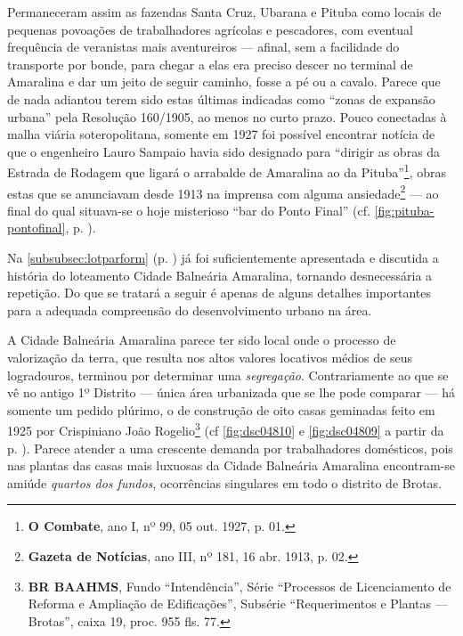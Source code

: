 Permaneceram assim as fazendas Santa Cruz, Ubarana e Pituba como locais de pequenas povoações de trabalhadores agrícolas e pescadores, com eventual frequência de veranistas mais aventureiros --- afinal, sem a facilidade do transporte por bonde, para chegar a elas era preciso descer no terminal de Amaralina e dar um jeito de seguir caminho, fosse a pé ou a cavalo. Parece que de nada adiantou terem sido estas últimas indicadas como ``zonas de expansão urbana'' pela Resolução 160/1905, ao menos no curto prazo. Pouco conectadas à malha viária soteropolitana, somente em 1927 foi possível encontrar notícia de que o engenheiro Lauro Sampaio havia sido designado para ``dirigir as obras da Estrada de Rodagem que ligará o arrabalde de Amaralina ao da Pituba''\footnote{\textbf{O Combate}, ano I, nº 99, 05 out. 1927, p. 01.}, obras estas que se anunciavam desde 1913 na imprensa com alguma ansiedade\footnote{\textbf{Gazeta de Notícias}, ano III, nº 181, 16 abr. 1913, p. 02.} --- ao final do qual situava-se o hoje misterioso ``bar do Ponto Final'' (cf. \autoref{fig:pituba-pontofinal}, p. \pageref{fig:pituba-pontofinal}).

Na \autoref{subsubsec:lotparform} (p. \pageref{subsubsec:lotparform}) já foi suficientemente apresentada e discutida a história do loteamento Cidade Balneária Amaralina, tornando desnecessária a repetição. Do que se tratará a seguir é apenas de alguns detalhes importantes para a adequada compreensão do desenvolvimento urbano na área. 


A Cidade Balneária Amaralina parece ter sido local onde o processo de valorização da terra, que resulta nos altos valores locativos médios de seus logradouros, terminou por determinar uma \textit{segregação}. Contrariamente ao que se vê no antigo 1º Distrito --- única área urbanizada que se lhe pode comparar --- há somente um pedido plúrimo, o de construção de oito casas geminadas feito em 1925 por Crispiniano João Rogelio\footnote{\textbf{BR BAAHMS}, Fundo ``Intendência'', Série ``Processos de Licenciamento de Reforma e Ampliação de Edificações'', Subsérie ``Requerimentos e Plantas --- Brotas'', caixa 19, proc. 955 fls. 77.} (cf \autoref{fig:dsc04810} e \autoref{fig:dsc04809} a partir da p. \pageref{fig:dsc04810}). Parece atender a uma crescente demanda por trabalhadores domésticos, pois nas plantas das casas mais luxuosas da Cidade Balneária Amaralina encontram-se amiúde \textit{quartos dos fundos}, ocorrências singulares em todo o distrito de Brotas.

